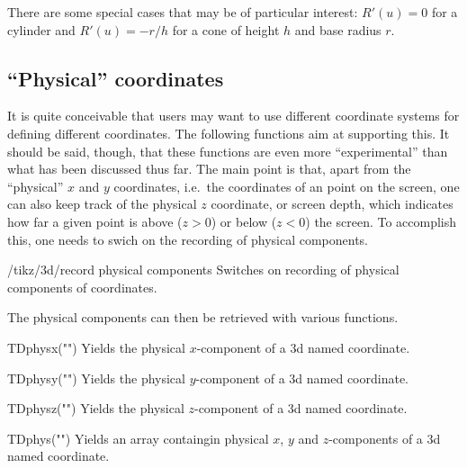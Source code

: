 \documentclass[a4paper,fleqn]{ltxdoc}
\begin{document}
There are some special cases that may be of particular interest: $R'(u)=0$ for a
cylinder and $R'(u)=-r/h$ for a cone of height $h$ and base radius $r$. 

\subsection{``Physical'' coordinates}
\label{sec:PhysicalCoordinates}

It is quite conceivable that users may want to use different coordinate systems
for defining different coordinates. The following functions aim at supporting
this. It should be said, though, that these functions are even more
``experimental'' than what has been discussed thus far. The main point is that,
apart from the ``physical'' $x$ and $y$ coordinates, i.e.\ the coordinates of an
point on the screen, one can also keep track of the physical $z$ coordinate, or
screen depth, which indicates how far a given point is above  ($z>0$) or below
($z<0$) the screen. To accomplish this, one needs to swich on the recording of
physical components.

\begin{key}{/tikz/3d/record physical components}
        Switches on recording of physical components of coordinates.
\end{key}

The physical components can then be retrieved with various functions.

\begin{math-function}{TDphysx("")}
   Yields the physical $x$-component of a 3d named coordinate.
\end{math-function}

\begin{math-function}{TDphysy("")}
   Yields the physical $y$-component of a 3d named coordinate.
\end{math-function}

\begin{math-function}{TDphysz("")}
   Yields the physical $z$-component of a 3d named coordinate.
\end{math-function}

\begin{math-function}{TDphys("")}
   Yields an array containgin physical $x$, $y$ and $z$-components of a 3d named coordinate.
\end{math-function}
\end{document}
